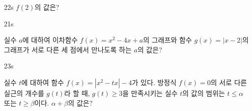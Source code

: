 \documentclass[10pt]{article}
\begin{document}
\begin{pagepair}
\begin{minipage}[t][\probboxheight][t]{0.46\linewidth}
\begin{problem}{22}{s}
$f(2)$의 값은?
\begin{choices}
\end{choices}
\end{problem}
\end{minipage}
\par\vspace{4mm}
\noindent
\begin{minipage}[t][\probboxheight][t]{0.46\linewidth}
\begin{problem}{21}{s}
\par\smallskip
실수 $a$에 대하여 이차함수 $f(x) = x^2 - 4x + a$의 그래프와 함수 $g(x) = |x - 2|$의 그래프가 서로 다른 세 점에서 만나도록 하는 $a$의 값은?
\begin{choices}
\end{choices}
\end{problem}
\end{minipage}\hfill
\begin{minipage}[t][\probboxheight][t]{0.46\linewidth}
\begin{problem}{23}{s}
\par\smallskip
실수 $t$에 대하여 함수 $f(x) = |x^2 - tx| - 4$가 있다. 방정식 $f(x) = 0$의 서로 다른 실근의 개수를 $g(t)$라 할 때, $g(t) \ge 3$을 만족시키는 실수 $t$의 값의 범위는 $t \le \alpha$ 또는 $t \ge \beta$이다. $\alpha + \beta$의 값은?
\begin{choices}
\end{choices}
\end{problem}
\end{minipage}
\end{pagepair}
\end{document}
